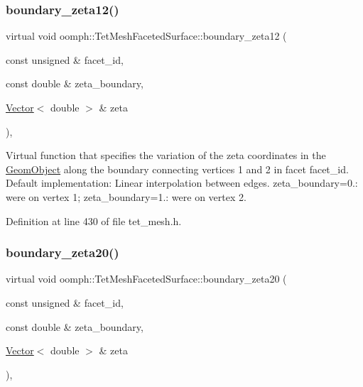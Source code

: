 \subsubsection{\texorpdfstring{boundary\+\_\+zeta12()}{boundary\_zeta12()}}
{\footnotesize\ttfamily virtual void oomph\+::\+Tet\+Mesh\+Faceted\+Surface\+::boundary\+\_\+zeta12 (\begin{DoxyParamCaption}\item[{const unsigned \&}]{facet\+\_\+id,  }\item[{const double \&}]{zeta\+\_\+boundary,  }\item[{\hyperlink{classoomph_1_1Vector}{Vector}$<$ double $>$ \&}]{zeta }\end{DoxyParamCaption})\hspace{0.3cm}{\ttfamily [inline]}, {\ttfamily [virtual]}}



Virtual function that specifies the variation of the zeta coordinates in the \hyperlink{classoomph_1_1GeomObject}{Geom\+Object} along the boundary connecting vertices 1 and 2 in facet facet\+\_\+id. Default implementation\+: Linear interpolation between edges. zeta\+\_\+boundary=0.\+: we\textquotesingle{}re on vertex 1; zeta\+\_\+boundary=1.\+: we\textquotesingle{}re on vertex 2. 



Definition at line 430 of file tet\+\_\+mesh.\+h.

\mbox{\label{classoomph_1_1TetMeshFacetedSurface_aa9c92e3c5ba628cdcc91086c9cb38c22}} 
\subsubsection{\texorpdfstring{boundary\+\_\+zeta20()}{boundary\_zeta20()}}
{\footnotesize\ttfamily virtual void oomph\+::\+Tet\+Mesh\+Faceted\+Surface\+::boundary\+\_\+zeta20 (\begin{DoxyParamCaption}\item[{const unsigned \&}]{facet\+\_\+id,  }\item[{const double \&}]{zeta\+\_\+boundary,  }\item[{\hyperlink{classoomph_1_1Vector}{Vector}$<$ double $>$ \&}]{zeta }\end{DoxyParamCaption})\hspace{0.3cm}{\ttfamily [inline]}, {\ttfamily [virtual]}}



